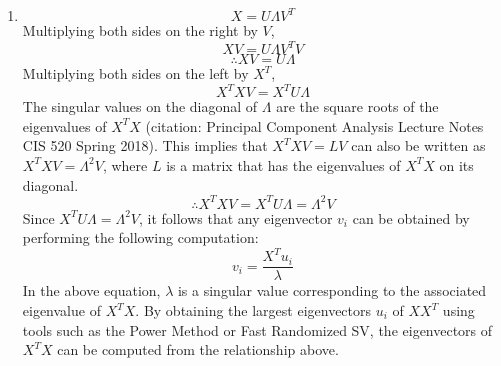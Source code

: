 \documentclass[english]{article}
\begin{document}
\begin{enumerate}
\item 
$$X = U{\Lambda}V^T$$
Multiplying both sides on the right by $V$,
$$XV = U{\Lambda}V^TV$$
$$\therefore XV = U{\Lambda}$$
Multiplying both sides on the left by $X^T$,
$$X^TXV = X^TU{\Lambda}$$
The singular values on the diagonal of $\Lambda$ are the square roots of the eigenvalues of $X^TX$ (citation: Principal Component Analysis Lecture Notes CIS 520 Spring 2018). This implies that $X^TXV = LV$ can also be written as $X^TXV = {\Lambda}^2V$, where $L$ is a matrix that has the eigenvalues of $X^TX$ on its diagonal. 
$$\therefore X^TXV = X^TU{\Lambda} = {\Lambda}^2V$$
Since $X^TU{\Lambda} = {\Lambda}^2V$, it follows that any eigenvector $v_i$ can be obtained by performing the following computation:
$$v_i = \frac{X^Tu_i}{\lambda}$$
In the above equation, $\lambda$ is a singular value corresponding to the associated eigenvalue of $X^TX$. By obtaining the largest eigenvectors $u_i$ of $XX^T$ using tools such as the Power Method or Fast Randomized SV, the eigenvectors of $X^TX$ can be computed from the relationship above. 

\end{enumerate}
\end{document}
